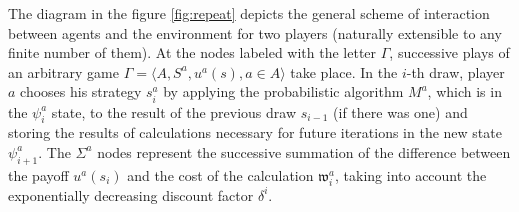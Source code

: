 The diagram in the figure \ref{fig:repeat} depicts the general scheme of interaction between agents and the environment for two players (naturally extensible to any finite number of them). At the nodes labeled with the letter $\Gamma$, successive plays of an arbitrary game $\Gamma = \langle A, S^a, u^a(s), a \in A \rangle$ take place. In the $i$-th draw, player $a$ chooses his strategy $s^a_i$ by applying the probabilistic algorithm $M^a$, which is in the $\psi^a_i$ state, to the result of the previous draw $s_{i-1}$ (if there was one) and storing the results of calculations necessary for future iterations in the new state $\psi^a_{i+1}$. The $\Sigma^a$ nodes represent the successive summation of the difference between the payoff $u^a(s_i)$ and the cost of the calculation $\mathfrak{w}^a_i$, taking into account the exponentially decreasing discount factor $\delta^i$. %

